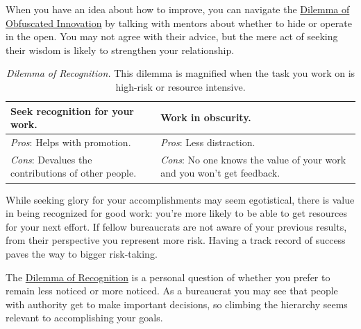 When you have an idea about how to improve, you can navigate the \hyperref[table:dilemma-personal-innovate-open-obscure]{Dilemma of Obfuscated Innovation} by talking with mentors about whether to hide or operate in the open. You may not agree with their advice, but the mere act of seeking their wisdom is likely to strengthen your relationship. 



\begin{center}
\begin{table}[H] %
\begin{tabular}{ | m{\dilemmatablewidth}| m{\dilemmatablewidth} | } 
  \hline
  \textbf{Seek recognition for your work.} &
  \textbf{Work in obscurity.} \\
  \hline
  \textit{Pros}: Helps with promotion. & 
  \textit{Pros}: Less distraction. \\
  \hline
  \textit{Cons}: Devalues the contributions of other people. & 
  \textit{Cons}: No one knows the value of your work and you won't get feedback. \\
  \hline
\end{tabular}
\caption{
\textit{Dilemma of Recognition.}
This dilemma is magnified when the task you work on is high-risk or resource intensive. 
}
\label{table:dilemma-personal-recognition-obscurity}
\end{table}
\end{center}

While seeking glory for your accomplishments may seem egotistical, there is value in being recognized for good work: you're more likely to be able to get resources for your next effort. If fellow bureaucrats are not aware of your previous results, from their perspective you represent more risk. Having a track record of success paves the way to bigger risk-taking.

The \hyperref[table:dilemma-personal-recognition-obscurity]{Dilemma of Recognition} 
\iftoggle{printedonpaper}{ (\ref{table:dilemma-personal-recognition-obscurity}) }{}%
is a personal question of whether you prefer to remain less noticed or more noticed. As a bureaucrat you may see that people with authority get to make important decisions, so climbing the hierarchy seems relevant to accomplishing your goals. 

